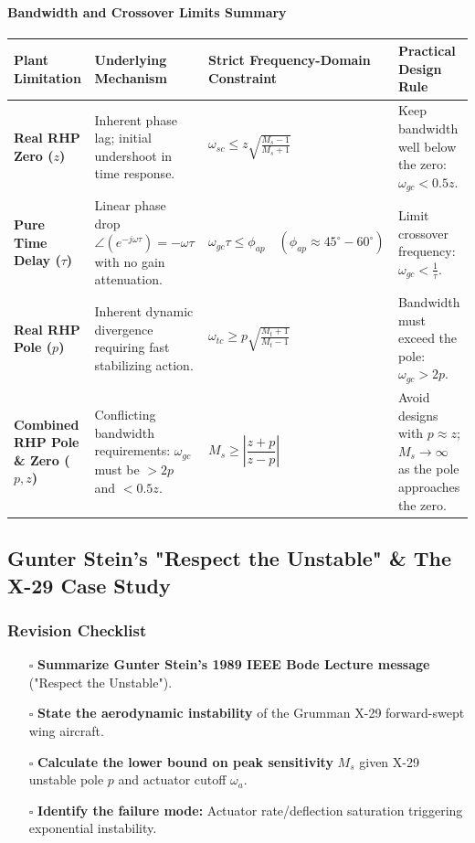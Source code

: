 \documentclass[12pt,onecolumn,twoside ]{article}
\begin{document}
	\paragraph{Bandwidth and Crossover Limits Summary}
	\begin{center}\small\begin{tabularx}{\textwidth}{*{4}{Y}}
			\toprule
			\textbf{Plant Limitation} & \textbf{Underlying Mechanism} & \textbf{Strict Frequency-Domain Constraint} & \textbf{Practical Design Rule} \\
			\midrule
			\textbf{Real RHP Zero ($z$)} & Inherent phase lag; initial undershoot in time response. & $\omega_{sc} \le z \sqrt{\frac{M_s - 1}{M_s + 1}}$ & Keep bandwidth well below the zero: $\omega_{gc} < 0.5 z$. \\
			\textbf{Pure Time Delay ($\tau$)} & Linear phase drop $\angle(e^{-j\omega\tau}) = -\omega\tau$ with no gain attenuation. & $\omega_{gc} \tau \le \phi_{ap} \quad (\phi_{ap} \approx 45^\circ - 60^\circ)$ & Limit crossover frequency: $\omega_{gc} < \frac{1}{\tau}$. \\
			\textbf{Real RHP Pole ($p$)} & Inherent dynamic divergence requiring fast stabilizing action. & $\omega_{tc} \ge p \sqrt{\frac{M_t + 1}{M_t - 1}}$ & Bandwidth must exceed the pole: $\omega_{gc} > 2 p$. \\
			\textbf{Combined RHP Pole \& Zero ($p, z$)} & Conflicting bandwidth requirements: $\omega_{gc}$ must be $> 2p$ and $< 0.5z$. & $M_s \ge \left\lvert \dfrac{z + p}{z - p} \right\rvert$ & Avoid designs with $p \approx z$; $M_s \to \infty$ as the pole approaches the zero. \\
			\bottomrule
	\end{tabularx}\end{center}
	
	\subsection{Gunter Stein’s "Respect the Unstable" \& The X-29 Case Study}
	\subsubsection{Revision Checklist}
	\begin{itemize}
		\item[$\square$]
		\textbf{Summarize Gunter Stein’s 1989 IEEE Bode Lecture message} ("Respect the Unstable").
		\item[$\square$]
		\textbf{State the aerodynamic instability} of the Grumman X-29 forward-swept wing aircraft.
		\item[$\square$]
		\textbf{Calculate the lower bound on peak sensitivity} $M_s$ given X-29 unstable pole $p$ and actuator cutoff $\omega_a$.
		\item[$\square$]
		\textbf{Identify the failure mode:} Actuator rate/deflection saturation triggering exponential instability.
	\end{itemize}
	
\end{document}
